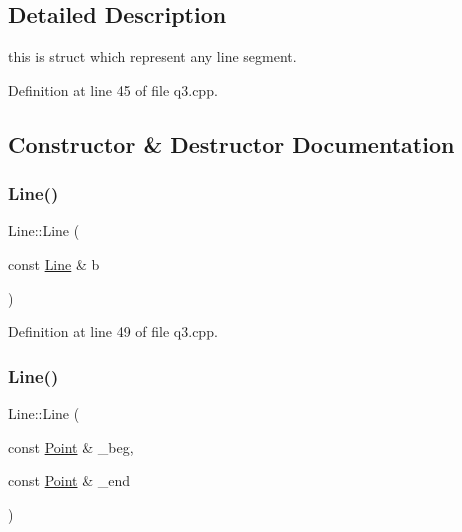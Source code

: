 \subsection{Detailed Description}
this is struct which represent any line segment. 

Definition at line 45 of file q3.\+cpp.



\subsection{Constructor \& Destructor Documentation}
\mbox{\label{struct_line_a549d53aa564e20ba316c241f4938254b}} 
\subsubsection{\texorpdfstring{Line()}{Line()}\hspace{0.1cm}{\footnotesize\ttfamily [1/2]}}
{\footnotesize\ttfamily Line\+::\+Line (\begin{DoxyParamCaption}\item[{const \hyperlink{struct_line}{Line} \&}]{b }\end{DoxyParamCaption})\hspace{0.3cm}{\ttfamily [inline]}}



Definition at line 49 of file q3.\+cpp.

\mbox{\label{struct_line_acd6e6638a77890435f82abb1e666dd25}} 
\subsubsection{\texorpdfstring{Line()}{Line()}\hspace{0.1cm}{\footnotesize\ttfamily [2/2]}}
{\footnotesize\ttfamily Line\+::\+Line (\begin{DoxyParamCaption}\item[{const \hyperlink{struct_point}{Point} \&}]{\+\_\+beg,  }\item[{const \hyperlink{struct_point}{Point} \&}]{\+\_\+end }\end{DoxyParamCaption})\hspace{0.3cm}{\ttfamily [inline]}}



